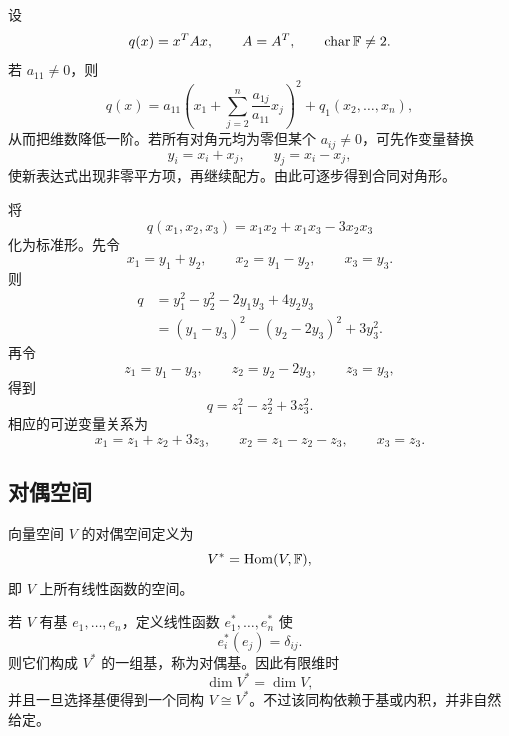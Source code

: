 设
\begin{equation}
 q(x)=x^TAx,
 \qquad A=A^T,
 \qquad \operatorname{char}\mathbb F\neq2.
\end{equation}
若 $a_{11}\neq0$，则
\begin{equation}
 q(x)=a_{11}
 \left(x_1+\sum_{j=2}^n\frac{a_{1j}}{a_{11}}x_j\right)^2
 +q_1(x_2,\ldots,x_n),
\end{equation}
从而把维数降低一阶。若所有对角元均为零但某个 $a_{ij}\neq0$，可先作变量替换
\begin{equation}
 y_i=x_i+x_j,
 \qquad
 y_j=x_i-x_j,
\end{equation}
使新表达式出现非零平方项，再继续配方。由此可逐步得到合同对角形。

\begin{example}
将
\begin{equation}
 q(x_1,x_2,x_3)=x_1x_2+x_1x_3-3x_2x_3
\end{equation}
化为标准形。先令
\begin{equation}
 x_1=y_1+y_2,
 \qquad
 x_2=y_1-y_2,
 \qquad
 x_3=y_3.
\end{equation}
则
\begin{align}
 q&=y_1^2-y_2^2-2y_1y_3+4y_2y_3\\
  &=(y_1-y_3)^2-(y_2-2y_3)^2+3y_3^2.
\end{align}
再令
\begin{equation}
 z_1=y_1-y_3,
 \qquad
 z_2=y_2-2y_3,
 \qquad
 z_3=y_3,
\end{equation}
得到
\begin{equation}
 q=z_1^2-z_2^2+3z_3^2.
\end{equation}
相应的可逆变量关系为
\begin{equation}
 x_1=z_1+z_2+3z_3,
 \qquad
 x_2=z_1-z_2-z_3,
 \qquad
 x_3=z_3.
\end{equation}
\end{example}

\subsection{对偶空间}

\begin{definition}
向量空间 $V$ 的对偶空间定义为
\begin{equation}
 V^*=\operatorname{Hom}(V,\mathbb F),
\end{equation}
即 $V$ 上所有线性函数的空间。
\end{definition}

若 $V$ 有基 $e_1,\ldots,e_n$，定义线性函数 $e_1^*,\ldots,e_n^*$ 使
\begin{equation}
 e_i^*(e_j)=\delta_{ij}.
\end{equation}
则它们构成 $V^*$ 的一组基，称为对偶基。因此有限维时
\begin{equation}
 \dim V^*=\dim V,
\end{equation}
并且一旦选择基便得到一个同构 $V\cong V^*$。不过该同构依赖于基或内积，并非自然给定。

